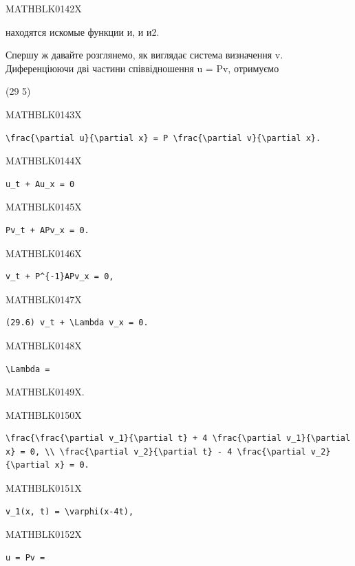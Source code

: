 \documentclass[
  ukrainian,
]{article}
\begin{document}
MATHBLK0142X

находятся искомые функции и, и и2.

Спершу ж давайте розглянемо, як виглядає система визначення v.
Диференціюючи дві частини співвідношення u = Pv, отримуємо

(29 5)

MATHBLK0143X

\begin{verbatim}
\frac{\partial u}{\partial x} = P \frac{\partial v}{\partial x}.
\end{verbatim}

MATHBLK0144X

\begin{verbatim}
u_t + Au_x = 0
\end{verbatim}

MATHBLK0145X

\begin{verbatim}
Pv_t + APv_x = 0.
\end{verbatim}

MATHBLK0146X

\begin{verbatim}
v_t + P^{-1}APv_x = 0,
\end{verbatim}

MATHBLK0147X

\begin{verbatim}
(29.6) v_t + \Lambda v_x = 0.
\end{verbatim}

MATHBLK0148X

\begin{verbatim}
\Lambda =
\end{verbatim}

MATHBLK0149X.

MATHBLK0150X

\begin{verbatim}
\frac{\frac{\partial v_1}{\partial t} + 4 \frac{\partial v_1}{\partial x} = 0, \\ \frac{\partial v_2}{\partial t} - 4 \frac{\partial v_2}{\partial x} = 0.
\end{verbatim}

MATHBLK0151X

\begin{verbatim}
v_1(x, t) = \varphi(x-4t),
\end{verbatim}

MATHBLK0152X

\begin{verbatim}
u = Pv =
\end{verbatim}
\end{document}

